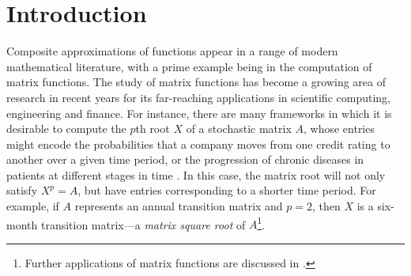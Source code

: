 \chapter{Introduction}\label{intro}

Composite approximations of functions appear in a range of modern mathematical literature, with a prime example being in the computation of matrix functions. The study of matrix functions has become a growing area of research in recent years for its far-reaching applications in scientific computing, engineering and finance. For instance, there are many frameworks in which it is desirable to compute the $p$th root $X$ of a stochastic matrix $A$, whose entries might encode the probabilities that a company moves from one credit rating to another over a given time period, or the progression of chronic diseases in patients at different stages in time \cite{Highammatrixroots}. In this case, the matrix root will not only satisfy $X^p=A$, but have entries corresponding to a shorter time period. For example, if $A$ represents an annual transition matrix and $p=2$, then $X$ is a six-month transition matrix---a \textit{matrix square root} of $A$\footnote{Further applications of matrix functions are discussed in \cite{highmatrix,Kennedy}.}.

\bigskip{}

